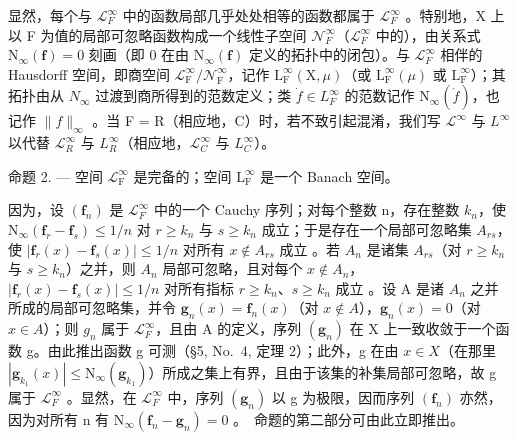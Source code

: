 显然，每个与 \(\mathcal{L}_{F}^{\infty}\) 中的函数局部几乎处处相等的函数都属于 \(\mathcal{L}_{F}^{\infty}\) 。特别地，X 上以 F 为值的局部可忽略函数构成一个线性子空间 \(\mathcal{N}_{F}^{\infty}\)（\(\mathcal{L}_{F}^{\infty}\) 中的），由关系式 \(\mathrm{N}_{\infty}(\mathbf{f}) = 0\) 刻画（即 0 在由 \(\mathrm{N}_{\infty}(\mathbf{f})\) 定义的拓扑中的闭包）。与 \(\mathcal{L}_{F}^{\infty}\) 相伴的 Hausdorff 空间，即商空间 \(\mathcal{L}_{\mathrm{F}}^{\infty}/\mathcal{N}_{\mathrm{F}}^{\infty}\)，记作 \(\mathrm{L}_{\mathrm{F}}^{\infty}(\mathrm{X}, \mu)\)（或 \(\mathrm{L}_{\mathrm{F}}^{\infty}(\mu)\) 或 \(\mathrm{L}_{\mathrm{F}}^{\infty}\)）；其拓扑由从 \(N_{\infty}\) 过渡到商所得到的范数定义；类 \(\dot{f} \in L_{F}^{\infty}\) 的范数记作 \(\mathrm{N}_{\infty}(\dot{f})\)，也记作 \(\|f\|_{\infty}\) 。当 F = R（相应地，C）时，若不致引起混淆，我们写 \(\mathcal{L}^{\infty}\) 与 \(L^{\infty}\) 以代替 \(\mathcal{L}_{R}^{\infty}\) 与 \(L_{R}^{\infty}\)（相应地，\(\mathcal{L}_{C}^{\infty}\) 与 \(L_{C}^{\infty}\)）。

命题 2. --- 空间 \(\mathcal{L}_{\mathrm{F}}^{\infty}\) 是完备的；空间 \(\mathrm{L}_{\mathrm{F}}^{\infty}\) 是一个 Banach 空间。

因为，设 \((\mathbf{f}_{n})\) 是 \(\mathcal{L}_{F}^{\infty}\) 中的一个 Cauchy 序列；对每个整数 n，存在整数 \(k_{n}\)，使 \(\mathrm{N}_{\infty}(\mathbf{f}_{r}-\mathbf{f}_{s})\leqslant1/n\) 对 \(r\geqslant k_{n}\) 与 \(s\geqslant k_{n}\) 成立；于是存在一个局部可忽略集 \(A_{rs}\)，使 \(|\mathbf{f}_{r}(x)-\mathbf{f}_{s}(x)|\leqslant1/n\) 对所有 \(x\notin A_{rs}\) 成立 。若 \(A_{n}\) 是诸集 \(A_{rs}\)（对 \(r\geqslant k_{n}\) 与 \(s\geqslant k_{n}\)）之并，则 \(A_{n}\) 局部可忽略，且对每个 \(x\notin A_{n}\)，\(|\mathbf{f}_{r}(x)-\mathbf{f}_{s}(x)|\leqslant1/n\) 对所有指标 \(r\geqslant k_{n}\)、\(s\geqslant k_{n}\) 成立 。设 A 是诸 \(A_{n}\) 之并所成的局部可忽略集，并令 \(\mathbf{g}_{n}(x)=\mathbf{f}_{n}(x)\)（对 \(x\notin A\)），\(\mathbf{g}_{n}(x)=0\)（对 \(x\in A\)）；则 \(g_{n}\) 属于 \(\mathcal{L}_{F}^{\infty}\)，且由 A 的定义，序列 \((\mathbf{g}_{n})\) 在 X 上一致收敛于一个函数 g。由此推出函数 g 可测（§5, No.~4, 定理 2）；此外，g 在由 \(x\in X\)（在那里 \(|\mathbf{g}_{k_{1}}(x)|\leqslant\mathrm{N}_{\infty}(\mathbf{g}_{k_{1}})\)）所成之集上有界，且由于该集的补集局部可忽略，故 g 属于 \(\mathcal{L}_{F}^{\infty}\) 。显然，在 \(\mathcal{L}_{F}^{\infty}\) 中，序列 \((\mathbf{g}_{n})\) 以 g 为极限，因而序列 \((\mathbf{f}_{n})\) 亦然，因为对所有 n 有 \(\mathrm{N}_{\infty}(\mathbf{f}_{n}-\mathbf{g}_{n})=0\) 。~命题的第二部分可由此立即推出。

